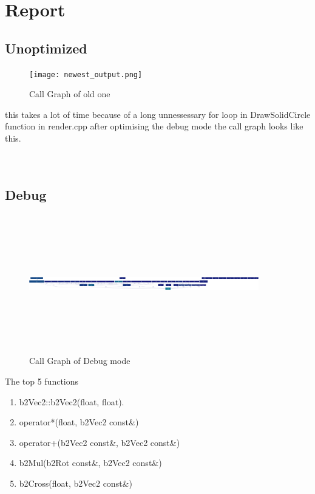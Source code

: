 \documentclass[a4paper]{article}
\begin{document}
\section{Report}
\subsection{Unoptimized}

\begin{figure}[h]

\centering
\texttt{[image: newest\_output.png]}
 \caption{Call Graph of old one }
\end{figure}

this takes a lot of time because of a long unnessessary for loop in DrawSolidCircle function in render.cpp
 after optimising the debug mode the call graph looks like this.
 \\
\\
\\
\subsection{Debug}

\begin{figure}[h]

\centering
\includegraphics[width=10cm, height=6cm]{debugVersion.png}
\caption{Call Graph of Debug mode }
\end{figure}


The top 5 functions 

\begin{enumerate}
  \item b2Vec2::b2Vec2(float, float).
  \item operator*(float, b2Vec2 const\&)
  \item operator+(b2Vec2 const\&, b2Vec2 const\&)
  \item b2Mul(b2Rot const\&, b2Vec2 const\&)
  \item b2Cross(float, b2Vec2 const\&)

\end{enumerate}
\end{document}
